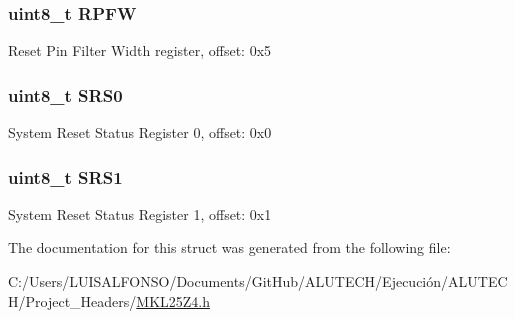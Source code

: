 \subsubsection[{R\+P\+F\+W}]{\setlength{\rightskip}{0pt plus 5cm}uint8\+\_\+t R\+P\+F\+W}\label{struct_r_c_m___mem_map_a8c3111caa4359258a32cb7db2b456445}
Reset Pin Filter Width register, offset\+: 0x5 \hypertarget{struct_r_c_m___mem_map_a72cc435004865ba66a0ca44630f10fd3}{}
\subsubsection[{S\+R\+S0}]{\setlength{\rightskip}{0pt plus 5cm}uint8\+\_\+t S\+R\+S0}\label{struct_r_c_m___mem_map_a72cc435004865ba66a0ca44630f10fd3}
System Reset Status Register 0, offset\+: 0x0 \hypertarget{struct_r_c_m___mem_map_a17104acf49b7e08ee75c675987528f92}{}
\subsubsection[{S\+R\+S1}]{\setlength{\rightskip}{0pt plus 5cm}uint8\+\_\+t S\+R\+S1}\label{struct_r_c_m___mem_map_a17104acf49b7e08ee75c675987528f92}
System Reset Status Register 1, offset\+: 0x1 

The documentation for this struct was generated from the following file\+:\begin{DoxyCompactItemize}
\item 
C\+:/\+Users/\+L\+U\+I\+S\+A\+L\+F\+O\+N\+S\+O/\+Documents/\+Git\+Hub/\+A\+L\+U\+T\+E\+C\+H/\+Ejecución/\+A\+L\+U\+T\+E\+C\+H/\+Project\+\_\+\+Headers/\hyperlink{_m_k_l25_z4_8h}{M\+K\+L25\+Z4.\+h}\end{DoxyCompactItemize}
